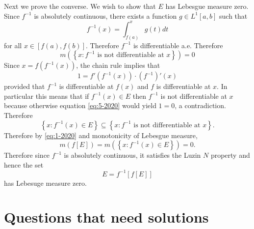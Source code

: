 \documentclass{exam}
\theoremstyle{problemstyle}
\newcommand{\1}[1]{\textbf{1}_{\left[#1\right]}} %
\begin{document}
\begin{questions}
\begin{solution}
  Next we prove the converse. We wish to show that $E$ has Lebesgue measure zero. Since $f^{-1}$ is absolutely continuous, there exists a function $g\in L^{1}[a,b]$ such that
  \begin{equation*}
    f^{-1}(x) = \int_{f(a)}^{x}g(t)dt 
  \end{equation*}
  for all $x\in [f(a),f(b)]$. Therefore $f^{-1}$ is differentiable a.e. Therefore
  \begin{equation} \label{eq:1-2020}
    m \left( \left\{ x: f^{-1} \text{ is not differentiable at }x \right\} \right)  = 0
  \end{equation}
  Since $x = f(f^{-1}(x))$, the chain rule implies that
  \begin{equation} \label{eq:5-2020}
    1= f'(f^{-1}(x))\cdot (f^{-1})'(x)
  \end{equation}
  provided that $f^{-1}$ is differentiable at $f(x)$ and $f$ is differentiable
  at $x$. In particular this means that if $f^{-1}(x)\in E$ then $f^{-1}$ is not differentiable at $x$
  because otherwise equation \eqref{eq:5-2020} would yield $1=0$, a contradiction.
  Therefore
  \begin{equation*}
    \left\{ x: f^{-1}(x)\in E \right\} \subseteq  \left\{ x: f^{-1} \text{ is not differentiable at }x \right\}.
  \end{equation*}
  Therefore by \eqref{eq:1-2020} and monotonicity of Lebesgue measure,
  \begin{equation*}
    m(f[E])= m\left(\left\{ x:f^{-1}(x)\in E \right\}\right)=0.
  \end{equation*}
  Therefore since $f^{-1}$ is absolutely continuous, it satisfies the Luzin $N$
  property and hence the set
  \begin{equation*}
    E = f^{-1}[f[E]]
  \end{equation*}
  has Lebesuge measure zero.
\end{solution}







\newpage
\section{Questions that need solutions}


\end{questions}
\end{document}

